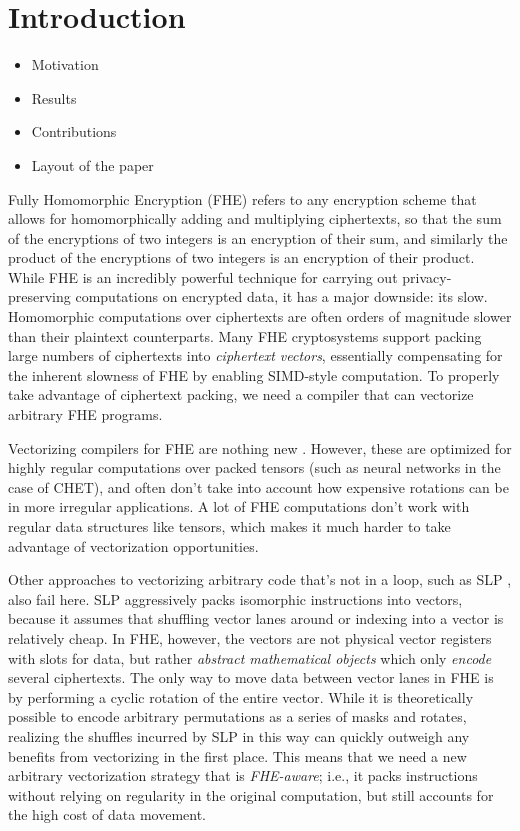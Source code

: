\section{Introduction}\label{sec:intro}
\begin{itemize}
    \item Motivation
    \item Results
    \item Contributions
    \item Layout of the paper
\end{itemize}

Fully Homomorphic Encryption (FHE) refers to any encryption scheme that allows for homomorphically adding and multiplying ciphertexts, so that the sum of the encryptions of two integers is an encryption of their sum, and similarly the product of the encryptions of two integers is an encryption of their product.
While FHE is an incredibly powerful technique for carrying out privacy-preserving computations on encrypted data, it has a major downside: its slow.
Homomorphic computations over ciphertexts are often orders of magnitude slower than their plaintext counterparts.
Many FHE cryptosystems support packing large numbers of ciphertexts into {\em ciphertext vectors}, essentially compensating for the inherent slowness of FHE by enabling SIMD-style computation.
To properly take advantage of ciphertext packing, we need a compiler that can vectorize arbitrary FHE programs.

Vectorizing compilers for FHE are nothing new \cite{CHET, Porcupine}.
However, these are optimized for highly regular computations over packed tensors (such as neural networks in the case of CHET), and often don't take into account how expensive rotations can be in more irregular applications.
A lot of FHE computations don't work with regular data structures like tensors, which makes it much harder to take advantage of vectorization opportunities.

Other approaches to vectorizing arbitrary code that's not in a loop, such as SLP \cite{SLP}, also fail here.
SLP aggressively packs isomorphic instructions into vectors, because it assumes that shuffling vector lanes around or indexing into a vector is relatively cheap.
In FHE, however, the vectors are not physical vector registers with slots for data, but rather {\em abstract mathematical objects} which only {\em encode} several ciphertexts.
The only way to move data between vector lanes in FHE is by performing a cyclic rotation of the entire vector.
While it is theoretically possible to encode arbitrary permutations as a series of masks and rotates, realizing the shuffles incurred by SLP in this way can quickly outweigh any benefits from vectorizing in the first place.
This means that we need a new arbitrary vectorization strategy that is {\em FHE-aware}; i.e., it packs instructions without relying on regularity in the original computation, but still accounts for the high cost of data movement.


